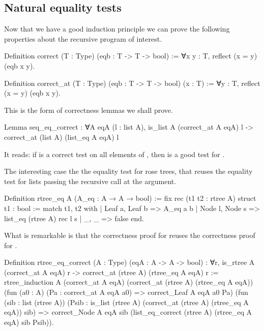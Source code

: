 \documentclass[a4paper, 11pt]{book}
\begin{document}
\subsection{Natural equality tests}

Now that we have a good induction principle we can prove the following
properties about the recursive program of interest.

\begin{coqcode}
Definition correct (T : Type) (eqb : T -> T -> bool) :=
  ∀x y : T, reflect (x = y) (eqb x y).

Definition correct_at (T : Type) (eqb : T -> T -> bool) (x : T) :=
  ∀y : T, reflect (x = y) (eqb x y).
\end{coqcode}

This is the form of correctness lemmas we shall prove.

\begin{coqcode}
Lemma seq_eq_correct : ∀A eqA (l : list A),
  is_list A (correct_at A eqA) l ->
    correct_at (list A) (list_eq A eqA) l
\end{coqcode}

It reads: if  is a correct test on all elements of ,
then  is a good test for .

The interesting case the the equality test for rose trees, that reuses
the equality test for lists  passing the recursive call
at the  argument.

\begin{coqcode}
Definition rtree_eq A (A_eq : A → A → bool) :=
  fix rec (t1 t2 : rtree A) {struct t1} : bool :=
    match t1, t2 with
    | Leaf a, Leaf b => A_eq a b
    | Node l, Node s => list_eq (rtree A) rec l s
    | _, _ => false
    end.
\end{coqcode}

What is remarkable is that the correctness proof for 
reuses the correctness proof for .

\begin{coqcode}
Definition rtree_eq_correct (A : Type) (eqA : A -> A -> bool) :
  ∀r, is_rtree A (correct_at A eqA) r ->
        correct_at (rtree A) (rtree_eq A eqA) r
:=
  rtree_induction
    A (correct_at A eqA) (correct_at (rtree A) (rtree_eq A eqA))
    (fun (a0 : A) (Pa : correct_at A eqA a0) =>
       correct_Leaf A eqA a0 Pa)
    (fun (sib : list (rtree A))
         (Psib : is_list (rtree A)
                   (correct_at (rtree A) (rtree_eq A eqA)) sib) =>
       correct_Node A eqA sib
         (list_eq_correct (rtree A) (rtree_eq A eqA) sib Psib)).
\end{coqcode}
\end{document}
